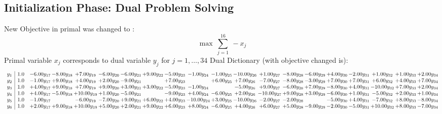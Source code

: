 \documentclass[9pt]{article}
\begin{document}
\subsection{Initialization Phase: Dual Problem Solving}
New Objective in primal was changed to : \[ \max\ \sum_{j=1}^{16}\ - x_j \] 
Primal variable $x_j$ corresponds to dual variable $y_j$ for $j = 1,\ldots,34$
Dual Dictionary (with objective changed is): 
\[\begin{array}{c| c c@{\hskip 2pt} c@{\hskip 2pt} c@{\hskip 2pt} c@{\hskip 2pt} c@{\hskip 2pt} c@{\hskip 2pt} c@{\hskip 2pt} c@{\hskip 2pt} c@{\hskip 2pt} c@{\hskip 2pt} c@{\hskip 2pt} c@{\hskip 2pt} c@{\hskip 2pt} c@{\hskip 2pt} c@{\hskip 2pt} c@{\hskip 2pt} c@{\hskip 2pt} c@{\hskip 2pt} }
 y_{1}   &  1.0 & -6.00 y_{17} & -8.00 y_{18} & +  7.00 y_{19} & -6.00 y_{20} & -6.00 y_{21} & +  9.00 y_{22} & -5.00 y_{23} & -1.00 y_{24} & -1.00 y_{25} & -10.00 y_{26} & +  1.00 y_{27} & -8.00 y_{28} & -6.00 y_{29} & +  4.00 y_{30} & -2.00 y_{31} & +  1.00 y_{32} & +  1.00 y_{33} & +  2.00 y_{34}\\
 y_{2}   &  1.0 & -1.00 y_{17} & +  9.00 y_{18} & +  4.00 y_{19} & +  2.00 y_{20} & -9.00 y_{21} &   & +  7.00 y_{23} &   & +  6.00 y_{25} & +  7.00 y_{26} & -7.00 y_{27} & -8.00 y_{28} & -3.00 y_{29} & +  7.00 y_{30} & +  7.00 y_{31} & +  6.00 y_{32} & +  4.00 y_{33} & +  7.00 y_{34}\\
 y_{3}   &  1.0 & +  4.00 y_{17} & +  9.00 y_{18} & +  7.00 y_{19} & +  9.00 y_{20} & +  3.00 y_{21} & +  3.00 y_{22} & -5.00 y_{23} & -1.00 y_{24} &   & -5.00 y_{26} & +  9.00 y_{27} & -6.00 y_{28} & +  7.00 y_{29} & -8.00 y_{30} & +  4.00 y_{31} & -10.00 y_{32} & +  7.00 y_{33} & +  2.00 y_{34}\\
 y_{4}   &  1.0 & +  4.00 y_{17} & -5.00 y_{18} & + 10.00 y_{19} & +  1.00 y_{20} & -5.00 y_{21} &   & -9.00 y_{23} & +  4.00 y_{24} & -6.00 y_{25} & +  2.00 y_{26} & -10.00 y_{27} & +  9.00 y_{28} & +  3.00 y_{29} & -6.00 y_{30} & +  1.00 y_{31} & -5.00 y_{32} & +  2.00 y_{33} & +  1.00 y_{34}\\
 y_{5}   &  1.0 & -1.00 y_{17} &   & -6.00 y_{19} & -7.00 y_{20} & +  9.00 y_{21} & +  6.00 y_{22} & +  4.00 y_{23} & -10.00 y_{24} & +  3.00 y_{25} & -10.00 y_{26} & -2.00 y_{27} & -2.00 y_{28} &   & -5.00 y_{30} & +  4.00 y_{31} & -7.00 y_{32} & +  8.00 y_{33} & -8.00 y_{34}\\
 y_{6}   &  1.0 & +  2.00 y_{17} & +  9.00 y_{18} & + 10.00 y_{19} & +  5.00 y_{20} & +  2.00 y_{21} & +  9.00 y_{22} & +  6.00 y_{23} & +  8.00 y_{24} & -6.00 y_{25} & +  4.00 y_{26} & +  6.00 y_{27} & +  5.00 y_{28} & -9.00 y_{29} & -2.00 y_{30} & -5.00 y_{31} & + 10.00 y_{32} & +  8.00 y_{33} & -7.00 y_{34}\\

\end{array}\]
\end{document}
